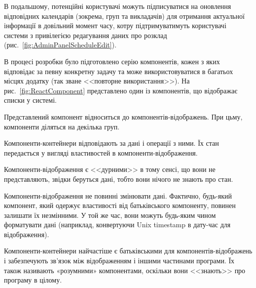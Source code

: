 
В подальшому, потенційні користувачі можуть підписуватися на оновлення відповідних календарів (зокрема, груп та викладачів) для отримання актуальної інформації в довільний момент часу, котру підтримуватимуть користувачі системи з привілегією редагування даних про розклад (рис.~\ref{fig:AdminPanelScheduleEdit}).


В процесі розробки було підготовлено серію компонентів, кожен з яких відповідає за певну конкретну задачу та може використовуватися в багатьох місцях додатку (так зване <<повторне використання>>). На рис.~\ref{fig:ReactComponent} представлено один із компонентів, що відображає списки у системі.

Представлений компонент відноситься до компонентів-відображень. При цьму, компоненти діляться на декілька груп. 

Компоненти-контейнери відповідають за дані і операції з ними. Їх стан передається у вигляді властивостей в компоненти-відображення.

Компоненти-відображення є <<дурними>> в тому сенсі, що вони не представляють, звідки беруться дані, тобто вони нічого не знають про стан.

Компоненти-відображення не повинні змінювати дані. Фактично, будь-який компонент, який одержує властивості від батьківського компоненту, повинен залишати їх незмінними. У той же час, вони можуть будь-яким чином форматувати дані (наприклад, конвертуючи Unix timestamp в дату-час для відображення).

Компоненти-контейнери найчастіше є батьківськими для компонентів-відображень і забезпечують зв'язок між відображенням і іншими частинами програми. Їх також називають «розумними» компонентами, оскільки вони <<знають>> про програму в цілому.

